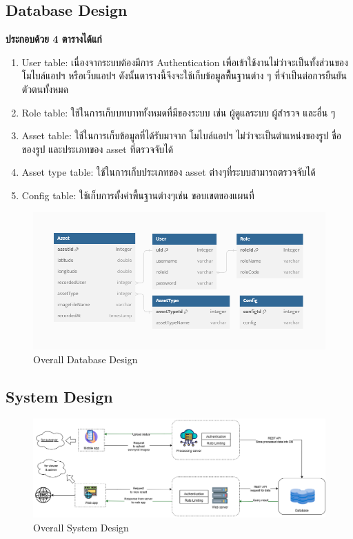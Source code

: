 \subsection{Database Design}
\textbf{ประกอบด้วย 4 ตารางได้แก่}
\begin{enumerate}
  \item User table: เนื่องจากระบบต้องมีการ Authentication เพื่อเข้าใช้งานไม่ว่าจะเป็นทั้งส่วนของ โมไบล์แอปฯ หรือเว็บแอปฯ 
  ดังนั้นตารางนี้จึงจะใช้เก็บข้อมูลพืื้นฐานต่าง ๆ ที่จำเป็นต่อการยืนยันตัวตนทั้งหมด 
  \item Role table: ใช้ในการเก็บบทบาททั้งหมดที่มีของระบบ เช่น ผู้ดูแลระบบ ผู้สำรวจ และอื่น ๆ 
  \item Asset table: ใช้ในการเก็บข้อมูลที่ได้รับมาจาก โมไบล์แอปฯ ไม่ว่าจะเป็นตำแหน่งของรูป ชื่อของรูป และประเภทของ asset ที่ตรวจจับได้ 
  \item Asset type table: ใช้ในการเก็บประเภทของ asset ต่างๆที่ระบบสามารถตรวจจับได้ 
  \item Config table: ใช้เก็บการตั้งค่าพื้นฐานต่างๆเช่น ขอบเขตของแผนที่ 
\end{enumerate}

\begin{figure}[ht]
  \begin{center}
  \includegraphics[scale=0.8]{resources/ScreetnerDB.png}
  \end{center}
  \caption[Database Design]{Overall Database Design}
  \label{fig:database}
\end{figure}

\subsection{System Design}

\begin{figure}[ht]
  \begin{center}
  \includegraphics[scale=0.4]{resources/SystemDesign.png}
  \end{center}
  \caption[System Design]{Overall System Design}
  \label{fig:system design}
\end{figure}

